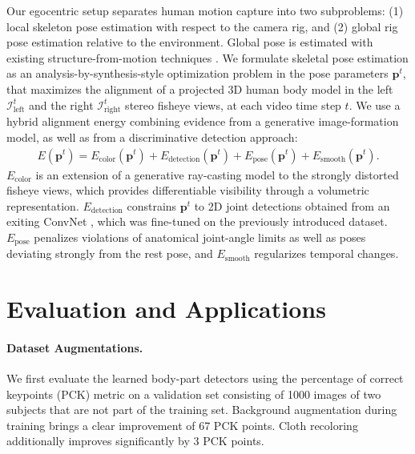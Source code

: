 \documentclass[runningheads]{llncs}
\newcommand{\pose}{\mathbf{p}}
\newcommand{\I}{\mathcal{I}}
\begin{document}
%
%
Our egocentric setup separates human motion capture into two subproblems: (1) local skeleton pose estimation with respect to the camera rig, and (2) global rig pose estimation relative to the environment.
Global pose is estimated with existing structure-from-motion techniques \cite{moulon2013global}.
%
We formulate skeletal pose estimation as an analysis-by-synthesis-style optimization problem in the pose parameters $\pose^t$, 
that maximizes the alignment of a projected 3D human body model in the left $\I_\text{left}^t$ and the right $\I_\text{right}^t$ stereo fisheye views, at each video time step $t$.
We use a hybrid alignment energy combining evidence from a generative image-formation model, as well as from a discriminative detection approach: 
%
%
%
\begin{align}
%
E(\pose^t) \!=\! E_\text{color}(\pose^t) \!+\! E_\text{detection}(\pose^t) \!+\! E_\text{pose}(\pose^t) \!+\! E_\text{smooth}(\pose^t)
\text{.}
\label{eqn:objective}
\end{align}
%
$E_\text{color}$ is an extension of a generative ray-casting model \cite{RhodiRRST2015} to the strongly distorted fisheye views, which provides differentiable visibility through a volumetric representation. 
$E_\text{detection}$ constrains $\pose^t$ to 2D joint detections obtained from an exiting ConvNet \cite{InsafPAAS2016}, which was fine-tuned on the previously introduced dataset.
$E_\text{pose}$ penalizes violations of anatomical joint-angle limits as well as poses deviating strongly from the rest pose, and $E_\text{smooth}$ regularizes temporal changes.


%
%
%
%
%
%
%
%
%
%
%
%
%
%
%
%
%
%
%
%
%
%
%
%
%
%
%
%
%

\section{Evaluation and Applications}
\label{sec:evaluation}

\paragraph{\textbf{Dataset Augmentations.}}
We first evaluate the learned body-part detectors using the percentage of correct keypoints (PCK) metric \cite{Sapp2013}
 on a validation set consisting of 1000 images of two subjects that are not part of the training set.
Background augmentation during training brings a clear improvement of 67 PCK points.
Cloth recoloring additionally improves significantly by 3 PCK points.
\end{document}
